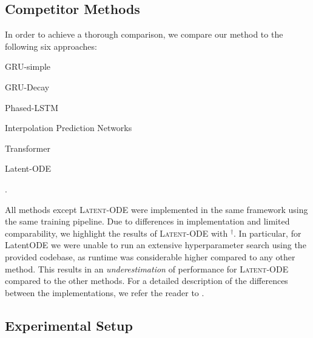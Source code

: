 \documentclass{article}
\newcommand{\method}[1]{\textsc{#1}}
\begin{document}
\subsection{Competitor Methods}


In order to achieve a thorough comparison, we compare our method to the
following six approaches: \begin{inparaenum}
    \item GRU-simple~\citep{che2018recurrent}
    \item GRU-Decay ~\citep{che2018recurrent}
    \item Phased-LSTM~\citep{neil2016phased}
    \item Interpolation Prediction Networks~\citep{shukla2018interpolationprediction}
    \item Transformer~\citep{vaswani2017attention}
    \item Latent-ODE~\citep{rubanova2019latent}
\end{inparaenum}.

All methods except \method{Latent-ODE} were implemented in the same framework
using the same training pipeline.
Due to differences in implementation and limited comparability, we highlight
the results of \method{Latent-ODE} with $^\dagger$.  In particular, for
LatentODE we were unable to run an extensive hyperparameter search using the
provided codebase, as runtime was considerable higher compared to any
other method.  This results in an \emph{underestimation} of performance for
\method{Latent-ODE} compared to the other methods. For a detailed description
of the differences between the implementations, we refer the reader to
.

\subsection{Experimental Setup}
\end{document}
